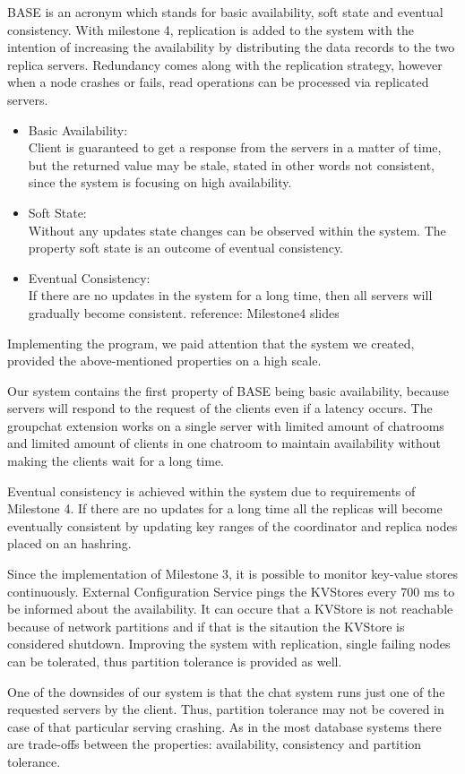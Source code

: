 BASE is an acronym which stands for basic availability, soft state and eventual consistency. With milestone 4, replication is added to the system with the intention of increasing the availability by distributing the data records to the two replica servers. Redundancy comes along with the replication strategy, however when a node crashes or fails, read operations can be processed via replicated servers.

\begin{itemize}
  \item Basic Availability:\\
 Client is guaranteed to get a response from the servers in a matter of time, but the returned value may be stale, stated in other words not consistent, since the system is focusing on high availability.
  \item Soft State:\\
Without any updates state changes can be observed within the system. The property soft state is an outcome of eventual consistency.
  \item Eventual Consistency:\\
If there are no updates in the system for a long time, then all servers will gradually become consistent. reference: Milestone4 slides
\end{itemize}

Implementing the program, we paid attention that the system we created, provided the above-mentioned properties on a high scale.

Our system contains the first property of BASE being basic availability, because servers will respond to the request of the clients even if a latency occurs. The groupchat extension works on a single server with limited amount of chatrooms and limited amount of clients in one chatroom to maintain availability without making the clients wait for a long time.

Eventual consistency is achieved within the system due to requirements of Milestone 4. If there are no updates for a long time all the replicas will become eventually consistent by updating key ranges of the coordinator and replica nodes placed on an hashring. 

Since the implementation of Milestone 3, it is possible to monitor key-value stores continuously. External Configuration Service pings the KVStores every 700 ms to be informed about the availability. It can occure that a KVStore is not reachable because of network partitions and if that is the sitaution the KVStore is considered shutdown. Improving the system with replication, single failing nodes can be tolerated, thus partition tolerance is provided as well.

One of the downsides of our system is that the chat system runs just one of the requested servers by the client. Thus, partition tolerance may not be covered in case of that particular serving crashing. As in the most database systems there are trade-offs between the properties: availability, consistency and partition tolerance.

    


